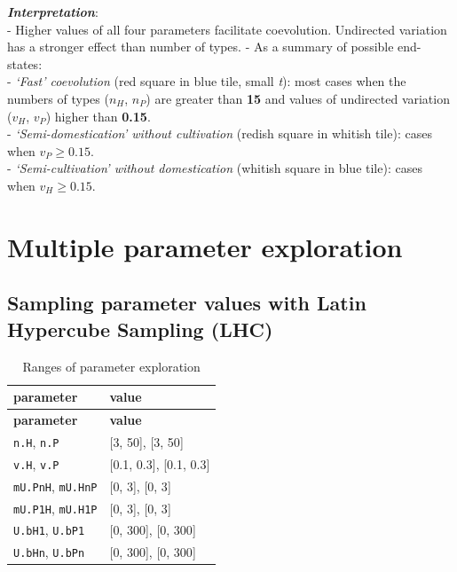 \documentclass[]{book}
\begin{document}
\textbf{\emph{Interpretation}}:\\
- Higher values of all four parameters facilitate coevolution. Undirected variation has a stronger effect than number of types.
- As a summary of possible end-states:\\
- \emph{`Fast' coevolution} (red square in blue tile, small \emph{t}): most cases when the numbers of types (\(n_{H}\), \(n_{P}\)) are greater than \textbf{15} and values of undirected variation (\(v_{H}\), \(v_{P}\)) higher than \textbf{0.15}.\\
- \emph{`Semi-domestication' without cultivation} (redish square in whitish tile): cases when \(v_{P}\geq 0.15\).\\
- \emph{`Semi-cultivation' without domestication} (whitish square in blue tile): cases when \(v_{H}\geq 0.15\).

\hypertarget{multiple-parameter-exploration}{%
\chapter{Multiple parameter exploration}\label{multiple-parameter-exploration}}

\newpage

\hypertarget{sampling-parameter-values-with-latin-hypercube-sampling-lhc}{%
\section{Sampling parameter values with Latin Hypercube Sampling (LHC)}\label{sampling-parameter-values-with-latin-hypercube-sampling-lhc}}

\begin{longtable}[]{@{}ll@{}}
\caption{Ranges of parameter exploration}\tabularnewline
\toprule
\textbf{parameter} & \textbf{value}\tabularnewline
\midrule
\endfirsthead
\toprule
\textbf{parameter} & \textbf{value}\tabularnewline
\midrule
\endhead
\texttt{n.H}, \texttt{n.P} & {[}3, 50{]}, {[}3, 50{]}\tabularnewline
\texttt{v.H}, \texttt{v.P} & {[}0.1, 0.3{]}, {[}0.1, 0.3{]}\tabularnewline
\texttt{mU.PnH}, \texttt{mU.HnP} & {[}0, 3{]}, {[}0, 3{]}\tabularnewline
\texttt{mU.P1H}, \texttt{mU.H1P} & {[}0, 3{]}, {[}0, 3{]}\tabularnewline
\texttt{U.bH1}, \texttt{U.bP1} & {[}0, 300{]}, {[}0, 300{]}\tabularnewline
\texttt{U.bHn}, \texttt{U.bPn} & {[}0, 300{]}, {[}0, 300{]}\tabularnewline
\bottomrule
\end{longtable}
\end{document}
